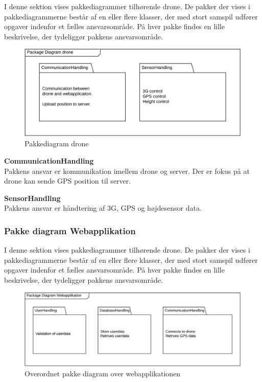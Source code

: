 I denne sektion vises pakkediagrammer tilhørende drone. De pakker der vises i pakkediagrammerne består af en eller flere klasser, der med stort samspil udfører opgaver indenfor et fælles ansvarsområde. På hver pakke findes en lille beskrivelse, der tydeliggør pakkens ansvarsområde. 


\begin{figure}[H]
	\centering
	\includegraphics[width=1\textwidth]{Billeder/pakke_diagrammer/iteration1_drone.png}
	\vspace{-0.5cm}
	\caption{Pakkediagram drone}
	\label{fig:iteration1_pakke_diagram_drone}
\end{figure}

\textbf{CommunicationHandling}\\
Pakkens ansvar er kommunikation imellem drone og server. Der er fokus på at drone kan sende GPS position til server.

\textbf{SensorHandling}\\
Pakkens ansvar er håndtering af 3G, GPS og højdesensor data.


\newpage
\subsubsection*{Pakke diagram Webapplikation}

I denne sektion vises pakkediagrammer tilhørende drone. De pakker der vises i pakkediagrammerne består af en eller flere klasser, der med stort samspil udfører opgaver indenfor et fælles ansvarsområde. På hver pakke findes en lille beskrivelse, der tydeliggør pakkens ansvarsområde.

\begin{figure}[H]
	\centering
	\includegraphics[width=1\textwidth]{Billeder/pakke_diagrammer/iteration1_server.png}
	\vspace{-0.5cm}
	\caption{Overordnet pakke diagram over webapplikationen}
	\label{fig:iteration1_pakke_diagram_webapp}
\end{figure}

